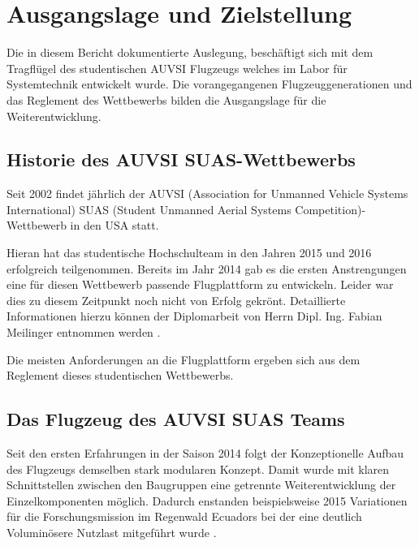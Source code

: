 \chapter{Ausgangslage und Zielstellung}\label{cha:Ausgangslage und Zielstellung}

Die in diesem Bericht dokumentierte Auslegung, beschäftigt sich mit dem Tragflügel des studentischen AUVSI Flugzeugs welches im Labor für Systemtechnik entwickelt wurde. Die vorangegangenen Flugzeuggenerationen und das Reglement des Wettbewerbs bilden die Ausgangslage für die Weiterentwicklung.

\section{Historie des AUVSI SUAS-Wettbewerbs}
Seit 2002 findet jährlich der AUVSI (Association for Unmanned Vehicle Systems International) SUAS (Student Unmanned Aerial Systems Competition)-Wettbewerb in den USA statt.

Hieran hat das studentische Hochschulteam in den Jahren 2015 und 2016 erfolgreich teilgenommen. Bereits im Jahr 2014 gab es die ersten Anstrengungen eine für diesen Wettbewerb passende Flugplattform zu entwickeln. Leider war dies zu diesem Zeitpunkt noch nicht von Erfolg gekrönt. Detaillierte Informationen hierzu können der Diplomarbeit von Herrn Dipl. Ing. Fabian Meilinger entnommen werden \cite{Meiling}.

Die meisten Anforderungen an die Flugplattform ergeben sich aus dem Reglement dieses studentischen Wettbewerbs. 

\clearpage

\section{Das Flugzeug des AUVSI SUAS Teams}

Seit den ersten Erfahrungen in der Saison 2014 folgt der Konzeptionelle Aufbau des Flugzeugs demselben stark modularen Konzept. Damit wurde mit klaren Schnittstellen zwischen den Baugruppen eine getrennte Weiterentwicklung der Einzelkomponenten möglich. Dadurch enstanden beispielsweise 2015 Variationen für die Forschungsmission im Regenwald Ecuadors bei der eine deutlich Voluminösere Nutzlast mitgeführt wurde \cite{Niclas}.

